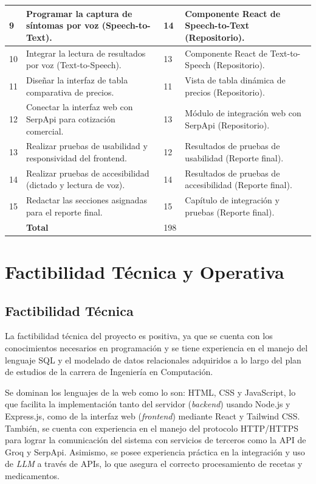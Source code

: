 {\begin{longtable}{p{} p{} p{} p{}}
9 &
Programar la captura de síntomas por voz (Speech-to-Text). &
14 &
Componente React de Speech-to-Text (Repositorio). \\
    \midrule

10 &
Integrar la lectura de resultados por voz (Text-to-Speech). &
13 &
Componente React de Text-to-Speech (Repositorio). \\
    \midrule

11 &
Diseñar la interfaz de tabla comparativa de precios. &
11 &
Vista de tabla dinámica de precios (Repositorio). \\
    \midrule

12 &
Conectar la interfaz web con SerpApi para cotización comercial. &
13 &
Módulo de integración web con SerpApi (Repositorio). \\
    \midrule

13 &
Realizar pruebas de usabilidad y responsividad del frontend. &
12 &
Resultados de pruebas de usabilidad (Reporte final). \\
    \midrule

14 &
Realizar pruebas de accesibilidad (dictado y lectura de voz). &
14 &
Resultados de pruebas de accesibilidad (Reporte final). \\
    \midrule

15 &
Redactar las secciones asignadas para el reporte final. &
15 &
Capítulo de integración y pruebas (Reporte final). \\
    \midrule

 &
\textbf{Total} &
198 &
 \\
\bottomrule
\end{longtable}
}

\section{Factibilidad Técnica y Operativa}

\subsection{Factibilidad Técnica}
La factibilidad técnica del proyecto es positiva, ya que se cuenta con los conocimientos necesarios en programación y se tiene experiencia en el manejo del lenguaje SQL y el modelado de datos relacionales adquiridos a lo largo del plan de estudios de la carrera de Ingeniería en Computación.

Se dominan los lenguajes de la web como lo son: HTML, CSS y JavaScript, lo que facilita la implementación tanto del servidor (\emph{backend}) usando Node.js y Express.js, como de la interfaz web (\emph{frontend}) mediante React y Tailwind CSS. También, se cuenta con experiencia en el manejo del protocolo HTTP/HTTPS para lograr la comunicación del sistema con servicios de terceros como la API de Groq y SerpApi. Asimismo, se posee experiencia práctica en la integración y uso de \emph{LLM} a través de APIs, lo que asegura el correcto procesamiento de recetas y medicamentos.

